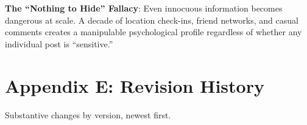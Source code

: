 \documentclass[11pt,letterpaper]{article}
\begin{document}
\textbf{The ``Nothing to Hide'' Fallacy}: Even innocuous information becomes dangerous at scale. A decade of location check-ins, friend networks, and casual comments creates a manipulable psychological profile regardless of whether any individual post is ``sensitive.''

\section*{Appendix E: Revision History}
\label{app:history}

Substantive changes by version, newest first.
\end{document}
